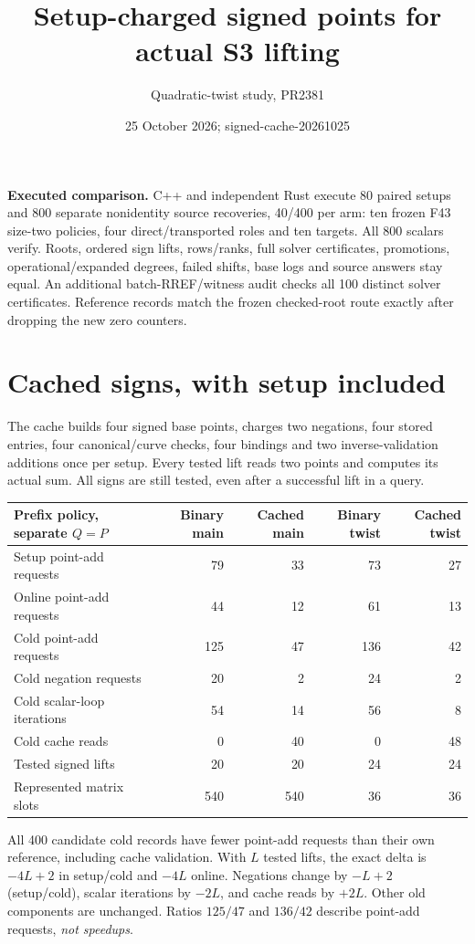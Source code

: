 \documentclass[10pt]{article}
\title{Setup-charged signed points for actual S3 lifting}
\author{Quadratic-twist study, PR2381}
\date{25 October 2026; signed-cache-20261025}
\begin{document}
\sloppy\maketitle
\noindent\textbf{Executed comparison.} C++ and independent Rust execute
80 paired setups and 800 separate nonidentity source recoveries, 40/400 per arm:
ten frozen F43 size-two policies, four direct/transported roles and ten targets.
All 800 scalars verify. Roots, ordered sign lifts, rows/ranks, full solver
certificates, promotions, operational/expanded degrees, failed shifts, base logs
and source answers stay equal. An additional batch-RREF/witness audit checks
all 100 distinct solver certificates. Reference records match the frozen
checked-root route exactly after dropping the new zero counters.

\section*{Cached signs, with setup included}
The cache builds four signed base points, charges two negations, four stored
entries, four canonical/curve checks, four bindings and two inverse-validation
additions once per setup. Every tested lift reads two points and computes its
actual sum. All signs are still tested, even after a successful lift in a query.

\begin{center}\begin{tabular}{lrrrr}\toprule
Prefix policy, separate $Q=P$ & Binary main & Cached main & Binary twist & Cached twist\\\midrule
Setup point-add requests &79&33&73&27\\
Online point-add requests &44&12&61&13\\
Cold point-add requests &125&47&136&42\\
Cold negation requests &20&2&24&2\\
Cold scalar-loop iterations &54&14&56&8\\
Cold cache reads &0&40&0&48\\
Tested signed lifts &20&20&24&24\\
Represented matrix slots &540&540&36&36\\\bottomrule
\end{tabular}\end{center}
All 400 candidate cold records have fewer point-add requests than their own
reference, including cache validation. With $L$ tested lifts, the exact delta
is $-4L+2$ in setup/cold and $-4L$ online. Negations change by $-L+2$
(setup/cold), scalar iterations by $-2L$, and cache reads by $+2L$.
Other old components are unchanged. Ratios $125/47$ and $136/42$ describe
point-add requests, \emph{not speedups}.
\end{document}
